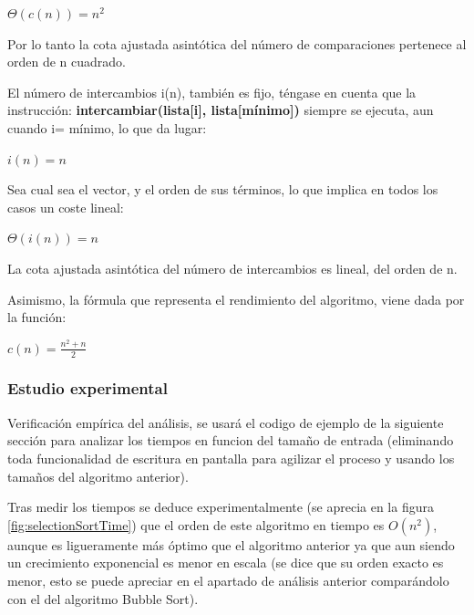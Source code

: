 \documentclass[8pt, A4]{article}    %
\begin{document}
\begin{center}
    ${\displaystyle \Theta (c(n))=n^{2}\;}$
\end{center}

Por lo tanto la cota ajustada asintótica del número de comparaciones pertenece al orden de n cuadrado.

El número de intercambios i(n), también es fijo, téngase en cuenta que la instrucción: \textbf{intercambiar(lista[i], lista[mínimo])} siempre se ejecuta, aun cuando i= mínimo, lo que da lugar:

\begin{center}
    ${\displaystyle i(n)=n\;}$
\end{center}

Sea cual sea el vector, y el orden de sus términos, lo que implica en todos los casos un coste lineal:

\begin{center}
    ${\displaystyle \Theta (i(n))=n\;}$
\end{center}

La cota ajustada asintótica del número de intercambios es lineal, del orden de n.

Asimismo, la fórmula que representa el rendimiento del algoritmo, viene dada por la función:

\begin{center}
    ${\displaystyle c(n)={\frac {n^{2}+n}{2}}}$
\end{center}

\subsubsection{Estudio experimental}
Verificación empírica del análisis, se usará el codigo de ejemplo de la siguiente sección para analizar los tiempos en funcion del tamaño de entrada (eliminando toda funcionalidad de escritura en pantalla para agilizar el proceso y usando los tamaños del algoritmo anterior).

Tras medir los tiempos se deduce experimentalmente (se aprecia en la figura \ref{fig:selectionSortTime}) que el orden de este algoritmo en tiempo es $O(n^2)$, aunque es ligueramente más óptimo que el algoritmo anterior ya que aun siendo un crecimiento exponencial es menor en escala (se dice que su orden exacto es menor, esto se puede apreciar en el apartado de análisis anterior comparándolo con el del algoritmo Bubble Sort).
\end{document}
